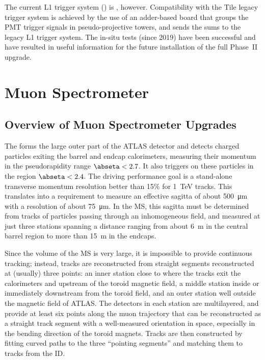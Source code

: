 \documentclass[cernpreprint, atlasdraft=false, UKenglish,british,orcidlogo, texmf, orcidlogo]{atlasdoc}
\begin{document}
The current \gls{L1} trigger system (\RunThr) is \analog, however. Compatibility with the \gls{Tile} legacy trigger system is achieved by the use of an adder-based board that groups the \gls{PMT} \analog trigger signals in pseudo-projective towers, and sends the \analog sums to the legacy \gls{L1} trigger system. The in-situ tests (since 2019) have been successful and have resulted in useful information for the future installation of the full Phase~II upgrade.
 
 
 


\clearpage
\newpage
 
\section{Muon Spectrometer} 
\label{sec:Muons}
 

\label{chapter:muons}
\subsection{Overview of Muon Spectrometer Upgrades \label{section:muonOverview}} 
The  forms the large outer part of the ATLAS detector and
detects charged particles exiting the barrel and endcap
calorimeters, measuring their momentum in the pseudorapidity range
$\abseta<2.7$. It also triggers on these particles in the
region $\abseta<2.4$. The driving performance goal is a stand-alone
transverse momentum resolution better than 15\% 
for \SI{1}{\TeV} tracks.
This translates into a requirement to measure an effective sagitta
of about \SI{500}{\um}
with a resolution
of about \SI{75}{\um}.
In the \gls{MS}, this sagitta must be determined from tracks of particles passing through an inhomogeneous field, and measured at just three stations spanning a distance ranging from about \SI{6}{\m} in the central barrel region to more than \SI{15}{\m} in the endcaps.
 
Since the volume of the \gls{MS} is very large, it is impossible to provide continuous tracking; instead, tracks are reconstructed from straight segments reconstructed at (usually) three points: an inner station close to where the tracks exit the calorimeters and upstream of the toroid magnetic field, a middle station inside or immediately downstream from the toroid field, and an outer station well outside the magnetic field of ATLAS. The detectors in each station are multilayered, and provide at least six points along the muon trajectory that can be reconstructed as a straight track segment with a well-measured orientation in space, especially in the bending direction of the toroid magnets. Tracks are then constructed by fitting curved paths to the three ``pointing segments'' and matching them to tracks from the \gls{ID}.
 
\end{document}
